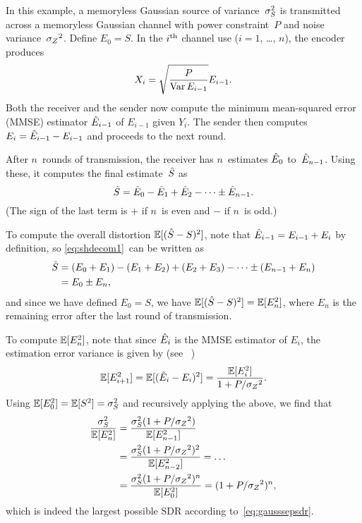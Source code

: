 \begin{example}
  \label{ex:gaussfb}
  In this example, a memoryless Gaussian source of variance~${\sigma_S^2}$ is
  transmitted across a memoryless Gaussian channel with power constraint~$P$ and
  noise variance~${{\sigma_Z}^2}$.  Define $E_0 = S$. In the $i{^{\text{th}}}$ channel use ($i = 1$,
  \dots, $n$), the encoder produces
  \begin{equation}
    \label{eq:gaussfbxi}
    X_i = \sqrt{\frac{P}{\operatorname{Var} E_{i-1}}} E_{i-1}.
  \end{equation}
  Both the receiver and the sender now compute the minimum mean-squared
  error (MMSE) estimator $\hat{E}_{i-1}$ of $E_{i-1}$ given $Y_i$. The sender then
  computes $E_i = \hat{E}_{i-1} - E_{i-1}$ and proceeds to the next round.

  After $n$~rounds of transmission, the receiver has $n$~estimates $\hat{E}_0$
  to~$\hat{E}_{n-1}$. Using these, it computes the final estimate~${\hat{S}}$ as
  \begin{equation}
    \label{eq:shdecom1}
    {\hat{S}} = \hat{E}_0 - \hat{E}_1 + \hat{E}_2 - \cdots \pm \hat{E}_{n-1}.
  \end{equation}
  (The sign of the last term is $+$ if $n$~is even and $-$ if $n$~is odd.)

  To compute the overall distortion ${\mathbb{E}[({\hat{S}} - S)^2]}$, note that $\hat{E}_{i-1} = E_{i-1} +
  E_i$ by definition, so \eqref{eq:shdecom1}~can be written as
  \begin{align*}
    {\hat{S}} &= (E_0 + E_1) - (E_1 + E_2) + (E_2 + E_3) - \cdots \pm (E_{n-1} + E_n)
    \\
    &= E_0 \pm E_n,
  \end{align*}
  and since we have defined $E_0 = S$, we have ${\mathbb{E}[({\hat{S}} - S)^2]} = \mathbb{E}[E_n^2]$, where $E_n$
  is the remaining error after the last round of transmission.

  To compute $\mathbb{E}[E_n^2]$, note that since $\hat{E}_i$ is the MMSE estimator of
  $E_i$, the estimation error variance is given by (see
  \eg~\cite[Section~8.3]{Scharf1990})
  \begin{equation}
    \label{eq:gaussvardec}
    \mathbb{E}[E_{i+1}^2] = \mathbb{E}[(\hat{E}_i - E_i)^2] = \frac{\mathbb{E}[E_i^2]}{1 + P/{{\sigma_Z}^2}}.
  \end{equation}
  Using $\mathbb{E}[E_0^2] = \mathbb{E}[S^2] = {\sigma_S^2}$ and recursively applying the above, we find
  that
  \begin{align*}
    \frac{{\sigma_S^2}}{\mathbb{E}[E_n^2]} &= \frac{{\sigma_S^2} (1 + P/{{\sigma_Z}^2})}{\mathbb{E}[E_{n-1}^2]} \\
    &= \frac{{\sigma_S^2}(1 + P/{{\sigma_Z}^2})^2}{\mathbb{E}[E_{n-2}^2]} = \dots \\
    &= \frac{{\sigma_S^2}(1 + P/{{\sigma_Z}^2})^n}{\mathbb{E}[E_0^2]} = (1 + P/{{\sigma_Z}^2})^n,
  \end{align*}
  which is indeed the largest possible SDR according to~\eqref{eq:gausssepsdr}.
\end{example}

